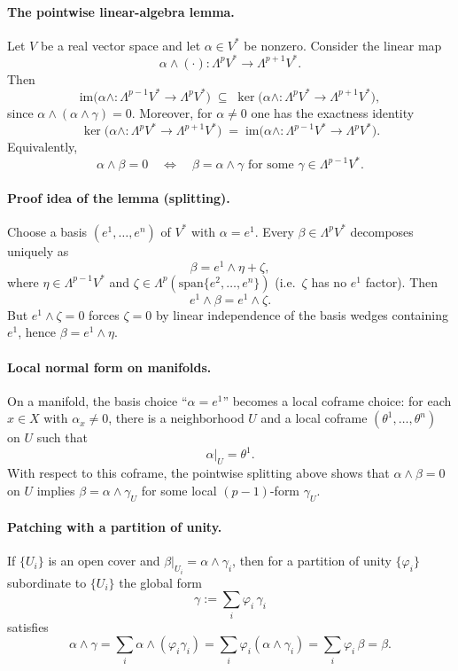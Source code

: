 \documentclass[12pt,a4paper]{article}
\theoremstyle{plain}
\theoremstyle{definition}      %
\begin{document}
	\paragraph{The pointwise linear-algebra lemma.}
	Let $V$ be a real vector space and let $\alpha\in V^*$ be nonzero. Consider the linear map
	\[
	\alpha\wedge(\cdot):\Lambda^p V^* \longrightarrow \Lambda^{p+1}V^*.
	\]
	Then
	\[
	\mathrm{im}\big(\alpha\wedge:\Lambda^{p-1}V^*\to\Lambda^{p}V^*\big)
	\;\subseteq\;
	\ker\big(\alpha\wedge:\Lambda^{p}V^*\to\Lambda^{p+1}V^*\big),
	\]
	since $\alpha\wedge(\alpha\wedge\gamma)=0$.
	Moreover, for $\alpha\neq 0$ one has the exactness identity
	\[
	\ker\big(\alpha\wedge:\Lambda^{p}V^*\to\Lambda^{p+1}V^*\big)
	\;=\;
	\mathrm{im}\big(\alpha\wedge:\Lambda^{p-1}V^*\to\Lambda^{p}V^*\big).
	\]
	Equivalently,
	\[
	\alpha\wedge\beta=0
	\quad\Longleftrightarrow\quad
	\beta=\alpha\wedge\gamma \text{ for some }\gamma\in\Lambda^{p-1}V^*.
	\]
	
	\paragraph{Proof idea of the lemma (splitting).}
	Choose a basis $(e^1,\dots,e^n)$ of $V^*$ with $\alpha=e^1$. Every $\beta\in\Lambda^pV^*$ decomposes uniquely as
	\[
	\beta = e^1\wedge\eta + \zeta,
	\]
	where $\eta\in\Lambda^{p-1}V^*$ and $\zeta\in\Lambda^p(\mathrm{span}\{e^2,\dots,e^n\})$ (i.e.\ $\zeta$ has no $e^1$ factor).
	Then
	\[
	e^1\wedge\beta = e^1\wedge\zeta.
	\]
	But $e^1\wedge\zeta=0$ forces $\zeta=0$ by linear independence of the basis wedges containing $e^1$, hence
	$\beta=e^1\wedge\eta$.
	
	\paragraph{Local normal form on manifolds.}
	On a manifold, the basis choice ``$\alpha=e^1$'' becomes a local coframe choice:
	for each $x\in X$ with $\alpha_x\neq 0$, there is a neighborhood $U$ and a local coframe
	$(\theta^1,\dots,\theta^n)$ on $U$ such that
	\[
	\alpha|_U = \theta^1.
	\]
	With respect to this coframe, the pointwise splitting above shows that $\alpha\wedge\beta=0$ on $U$
	implies $\beta=\alpha\wedge\gamma_U$ for some local $(p-1)$-form $\gamma_U$.
	
	\paragraph{Patching with a partition of unity.}
	If $\{U_i\}$ is an open cover and $\beta|_{U_i}=\alpha\wedge\gamma_i$, then for a partition of unity
	$\{\varphi_i\}$ subordinate to $\{U_i\}$ the global form
	\[
	\gamma := \sum_i \varphi_i\,\gamma_i
	\]
	satisfies
	\[
	\alpha\wedge\gamma
	= \sum_i \alpha\wedge(\varphi_i\gamma_i)
	= \sum_i \varphi_i(\alpha\wedge\gamma_i)
	= \sum_i \varphi_i\,\beta
	= \beta.
	\]
	
\end{document}
